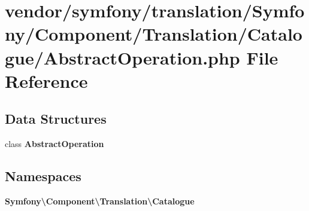 \section{vendor/symfony/translation/\+Symfony/\+Component/\+Translation/\+Catalogue/\+Abstract\+Operation.php File Reference}
\label{_abstract_operation_8php}
\subsection*{Data Structures}
\begin{DoxyCompactItemize}
\item 
class {\bf Abstract\+Operation}
\end{DoxyCompactItemize}
\subsection*{Namespaces}
\begin{DoxyCompactItemize}
\item 
 {\bf Symfony\textbackslash{}\+Component\textbackslash{}\+Translation\textbackslash{}\+Catalogue}
\end{DoxyCompactItemize}
